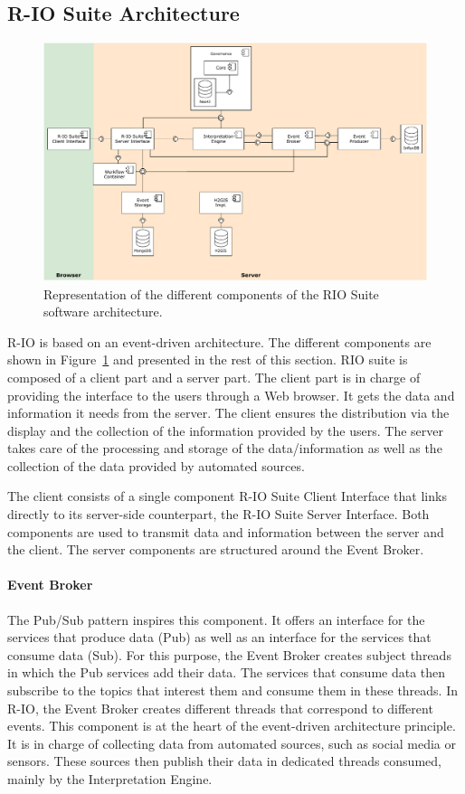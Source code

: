 \subsection{R-IO Suite Architecture}
\begin{figure}[htb]
    \centering
    \includegraphics[width=\textwidth]{figures/chap-5/RIO-archi.pdf}
    \caption{Representation of the different components of the RIO Suite software architecture.}
    \label{system:rio-archi}
\end{figure}

R-IO is based on an event-driven architecture.
The different components are shown in Figure~\ref{system:rio-archi} and presented in the rest of this section.
RIO suite is composed of a client part and a server part.
The client part is in charge of providing the interface to the users through a Web browser.
It gets the data and information it needs from the server.
The client ensures the distribution via the display and the collection of the information provided by the users.
The server takes care of the processing and storage of the data/information as well as the collection of the data provided by automated sources.

The client consists of a single component R-IO Suite Client Interface that links directly to its server-side counterpart, the R-IO Suite Server Interface.
Both components are used to transmit data and information between the server and the client.
The server components are structured around the Event Broker.
\paragraph{Event Broker}
The Pub/Sub pattern inspires this component.
It offers an interface for the services that produce data (Pub) as well as an interface for the services that consume data (Sub).
For this purpose, the Event Broker creates subject threads in which the Pub services add their data.
The services that consume data then subscribe to the topics that interest them and consume them in these threads.
In R-IO, the Event Broker creates different threads that correspond to different events.
This component is at the heart of the event-driven architecture principle.
It is in charge of collecting data from automated sources, such as social media or sensors.
These sources then publish their data in dedicated threads consumed, mainly by the Interpretation Engine.
